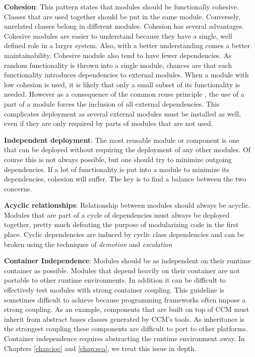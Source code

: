 \textbf{Cohesion}:
This pattern states that modules should be functionally cohesive. Classes that are used together should
be put in the same module. Conversely, unrelated classes belong in different modules. Cohesion has several
advantages. Cohesive modules are easier to understand because they have a single, well defined role in a
larger system. Also, with a better understanding comes a better maintainability. Cohesive module also tend
to have fewer dependencies. As random functionality is thrown into a single module, chances are that each
functionality introduces dependencies to external modules. When a module with low cohesion is used, it is
likely that only a small subset of its functionality is needed. However as a consequence of the common reuse
principle \cite{Martin}, the use of a part of a module forces the inclusion of all external dependencies.
This complicates deployment as several external modules must be installed as well, even if they are only
required by parts of modules that are not used.

\textbf{Independent deployment}:
The most reusable module or component is one that can be deployed without requiring the deployment of any other
modules. Of course this is not always possible, but one should try to minimize outgoing dependencies.
If a lot of functionality is put into a module to minimize its dependencies, cohesion will suffer.
The key is to find a balance between the two concerns.

\textbf{Acyclic relationships}:
Relationship between modules should always be acyclic. Modules that are part of a cycle of dependencies
must always be deployed together, pretty much defeating the purpose of modularizing code in the first place.
Cyclic dependencies are induced by cyclic class dependencies and can be broken using the techniques of
\emph{demotion} and \emph{escalation} \cite{Lakos}

\textbf{Container Independence}:
Modules should be as independent on their runtime container as possible. Modules that depend heavily on their
container are not portable to other runtime environments. In addition it can be difficult to effectively
test modules with strong container coupling. This guideline is sometimes difficult to achieve because
programming frameworks often impose a strong coupling. As an example, components that are built on top
of CCM must inherit from abstract bases classes generated by CCM's tools. As inheritance is the strongest coupling
these components are difficult to port to other platforms. Container independence requires abstracting the
runtime environment away. In Chapters \ref{chap:ioc} and \ref{chap:sca}, we treat this issue in depth.

